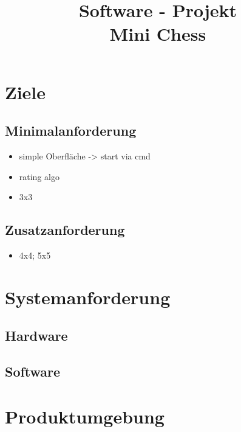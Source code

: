 \documentclass{article}
\title{\textbf{Software - Projekt\\Mini Chess}}
\date{\vspace{-5ex}}
\begin{document}
\maketitle
\thispagestyle{fancy}


\tableofcontents
\newpage


\section{Ziele}\label{section-goals}

\subsection{Minimalanforderung}
\begin{itemize}
    \item simple Oberfläche -> start via cmd
    \item rating algo
    \item 3x3
\end{itemize}

\subsection{Zusatzanforderung}
\begin{itemize}
    \item 4x4; 5x5
\end{itemize}



\section{Systemanforderung}\label{section-requirements}

\subsection{Hardware}
\subsection{Software}


\section{Produktumgebung}\label{section-product}
\end{document}
